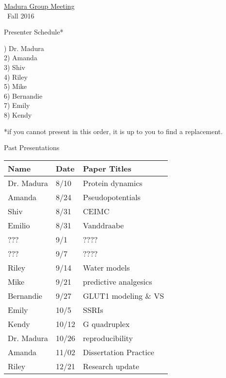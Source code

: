 \documentclass{article}
\begin{document}
\begin{center}
\Large{\underline{Madura Group Meeting}}\\
\
\small{Fall 2016}
\end{center}
\begin{center}
Presenter Schedule*

\end{center}

) Dr. Madura \\
2) Amanda \\
3) Shiv\\
4) Riley\\
5) Mike\\
6) Bernandie\\
7) Emily\\
8) Kendy\\

\vspace{0.5cm}

*if you cannot present in this order, it is up to you to find a replacement.
\vspace{1cm}
\begin{center}
Past Presentations

\end{center}
\vspace{.6cm}

\begin{tabularx}{\textwidth}{XXX}
Name \hfill &Date \hfill&Paper Titles \hfill\\ \toprule
Dr. Madura  &8/10 &Protein dynamics \\
Amanda  &8/24 &Pseudopotentials\\
Shiv &8/31 &CEIMC\\
Emilio &8/31 &Vanddraabe\\
??? &9/1 &????\\
??? &9/7 &????\\
Riley &9/14 &Water models\\
Mike &9/21 &predictive analgesics \\
Bernandie &9/27 &GLUT1 modeling \& VS \\
Emily & 10/5 & SSRIs\\
Kendy & 10/12 & G quadruplex\\
Dr. Madura & 10/26 & reproducibility\\
Amanda & 11/02 & Dissertation Practice\\
Riley & 12/21& Research update \\\bottomrule
\end{tabularx}
\end{document}
